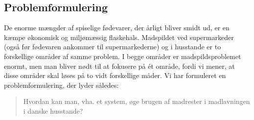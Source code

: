 \subsection{Problemformulering}
\label{subsec:problemformulering}
De enorme mængder af spiselige fødevarer, der årligt bliver smidt ud, er en kæmpe økonomisk og miljømæssig flaskehals. Madspildet ved supermarkeder (også før fødevaren ankommer til supermarkederne) og i husstande er to forskellige områder af samme problem. I begge områder er madspildsproblemet enormt, men man bliver nødt til at fokusere på ét område, fordi vi mener, at disse områder skal løses på to vidt forskellige måder.  Vi har formuleret en problemformulering, der lyder således:

\begin{quote}
Hvordan kan man, vha. et system, øge brugen af madrester i madlavningen i danske husstande?
\end{quote} 
